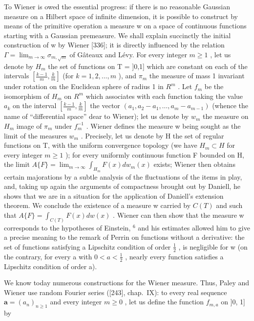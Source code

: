 To Wiener is owed the essential progress: if there is no reasonable Gaussian measure on a Hilbert space of infinite dimension, it is possible to construct by means of the primitive operation a measure w on a space of continuous functions starting with a Gaussian premeasure. We shall explain succinctly the initial construction of w by Wiener {[}336{]}; it is directly influenced by the relation \(\Gamma = \lim_{m \to \infty} \sigma_{m, \sqrt{m}}\) of Gâteaux and Lévy. For every integer \(m \geq 1\) , let us denote by \(H_m\) the set of functions on T = ]0,1] which are constant on each of the intervals \(\left[\frac{k-1}{m}, \frac{k}{m}\right]\) (for \(k = 1, 2, \ldots, m\) ), and \(\pi_m\) the measure of mass 1 invariant under rotation on the Euclidean sphere of radius 1 in \(R^m\) . Let \(f_m\) be the isomorphism of \(H_m\) on \(R^m\) which associates with each function taking the value \(a_k\) on the interval \(\left[\frac{k-1}{m}, \frac{k}{m}\right]\) the vector \((a_1, a_2 - a_1, \ldots, a_m - a_{m-1})\) (whence the name of ``differential space'' dear to Wiener); let us denote by \(w_m\) the measure on \(H_m\) image of \(\pi_m\) under \(f_m^{-1}\) . Wiener defines the measure w being sought as the limit of the measures \(w_m\) . Precisely, let us denote by H the set of regular functions on T, with the uniform convergence topology (we have \(H_m \subset H\) for every integer \(m \geq 1\) ); for every uniformly continuous function F bounded on H, the limit \(A\{F\} = \lim_{m \to \infty} \int_{H_m} F(x) dw_m(x)\) exists; Wiener then obtains certain majorations by a subtle analysis of the fluctuations of the items in play, and, taking up again the arguments of compactness brought out by Daniell, he shows that we are in a situation for the application of Daniell's extension theorem. We conclude the existence of a measure w carried by \(C(T)\) and such that \(A\{F\} = \int_{C(T)} F(x) dw(x)\) . Wiener can then show that the measure w corresponds to the hypotheses of Einstein, \(^{6}\) and his estimates allowed him to give a precise meaning to the remark of Perrin on functions without a derivative: the set of functions satisfying a Lipschitz condition of order \(\frac{1}{2}\) , is negligible for w (on the contrary, for every a with \(0 < a < \frac{1}{2}\) , nearly every function satisfies a Lipschitz condition of order a).

We know today numerous constructions for the Wiener measure. Thus, Paley and Wiener use random Fourier series ({[}243{]}, chap.~IX): to every real sequence \(\mathbf{a} = (a_{n})_{n \geq 1}\) and every integer \(m \geq 0\) , let us define the function \(f_{m,a}\) on ]0, 1] by

